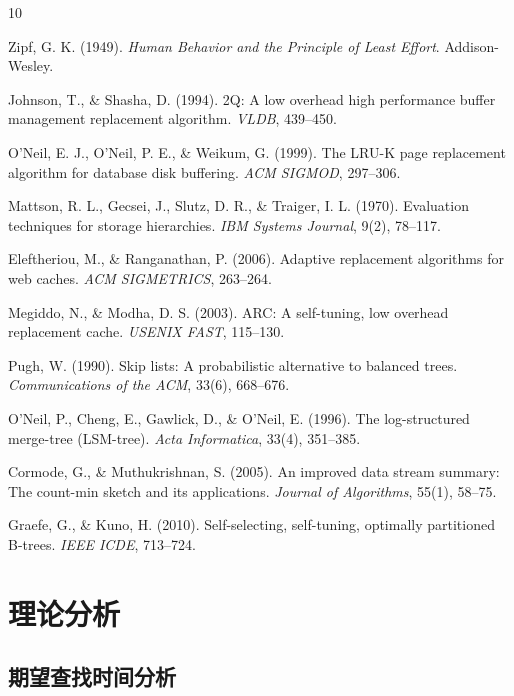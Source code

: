 \documentclass[11pt,a4paper]{article}
\begin{document}

\begin{thebibliography}{10}

Zipf, G. K. (1949). \textit{Human Behavior and the Principle of Least Effort}. Addison-Wesley.

Johnson, T., \& Shasha, D. (1994). 2Q: A low overhead high performance buffer management replacement algorithm. \textit{VLDB}, 439--450.

O'Neil, E. J., O'Neil, P. E., \& Weikum, G. (1999). The LRU-K page replacement algorithm for database disk buffering. \textit{ACM SIGMOD}, 297--306.

Mattson, R. L., Gecsei, J., Slutz, D. R., \& Traiger, I. L. (1970). Evaluation techniques for storage hierarchies. \textit{IBM Systems Journal}, 9(2), 78--117.

Eleftheriou, M., \& Ranganathan, P. (2006). Adaptive replacement algorithms for web caches. \textit{ACM SIGMETRICS}, 263--264.

Megiddo, N., \& Modha, D. S. (2003). ARC: A self-tuning, low overhead replacement cache. \textit{USENIX FAST}, 115--130.

Pugh, W. (1990). Skip lists: A probabilistic alternative to balanced trees. \textit{Communications of the ACM}, 33(6), 668--676.

O'Neil, P., Cheng, E., Gawlick, D., \& O'Neil, E. (1996). The log-structured merge-tree (LSM-tree). \textit{Acta Informatica}, 33(4), 351--385.

Cormode, G., \& Muthukrishnan, S. (2005). An improved data stream summary: The count-min sketch and its applications. \textit{Journal of Algorithms}, 55(1), 58--75.

Graefe, G., \& Kuno, H. (2010). Self-selecting, self-tuning, optimally partitioned B-trees. \textit{IEEE ICDE}, 713--724.

\end{thebibliography}

\appendix

\section{理论分析}

\subsection{期望查找时间分析}
\end{document}
